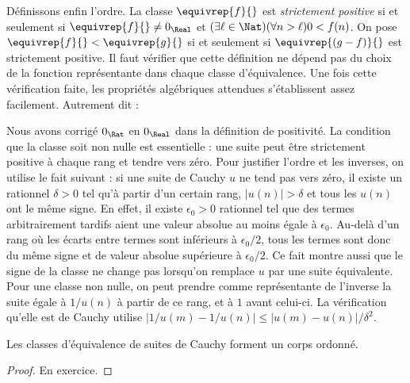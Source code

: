 \documentclass[11pt,a4paper,openany]{memoir}
\begin{document}
Définissons enfin l'ordre. La classe $\equivrep{f}{}$ est
\emph{strictement positive} si et seulement si
$\equivrep{f}{}\neq0_\Real$ et
$(\exists\ell\in\Nat)(\forall n>\ell)0<f(n)$.
On pose $\equivrep{f}{}<\equivrep{g}{}$ si et seulement si
$\equivrep{(g-f)}{}$ est strictement positive. Il faut vérifier que
cette définition ne dépend pas du choix de la fonction représentante
dans chaque classe d'équivalence.
Une fois cette vérification faite, les propriétés algébriques attendues
s'établissent assez facilement. Autrement dit :
\begin{editorial}
Nous avons corrigé $0_\Rat$ en $0_\Real$ dans la définition de
positivité. La condition que la classe soit non nulle est essentielle :
une suite peut être strictement positive à chaque rang et tendre vers
zéro. Pour justifier l'ordre et les inverses, on utilise le fait
suivant : si une suite de Cauchy $u$ ne tend pas vers zéro, il existe
un rationnel $\delta>0$ tel qu'à partir d'un certain rang,
$|u(n)|>\delta$ et tous les $u(n)$ ont le même signe. En effet, il
existe $\epsilon_0>0$ rationnel tel que des termes arbitrairement
tardifs aient une valeur absolue au moins égale à $\epsilon_0$.
Au-delà d'un rang où les écarts entre termes sont inférieurs à
$\epsilon_0/2$, tous les termes sont donc du même signe et de valeur
absolue supérieure à $\epsilon_0/2$. Ce fait montre aussi que le signe
de la classe ne change pas lorsqu'on remplace $u$ par une suite
équivalente. Pour une classe non nulle, on peut prendre comme
représentante de l'inverse la suite égale à $1/u(n)$ à partir de ce
rang, et à $1$ avant celui-ci. La vérification qu'elle est de Cauchy
utilise
$|1/u(m)-1/u(n)|\leq |u(m)-u(n)|/\delta^2$.
\end{editorial}
\begin{thm}
Les classes d'équivalence de suites de Cauchy forment un corps ordonné.
\end{thm}

\begin{proof}
En exercice.
\end{proof}
\end{document}
